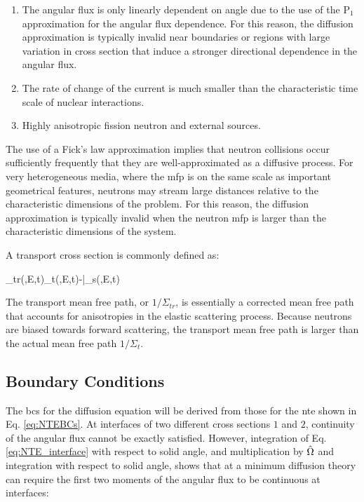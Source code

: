 \begin{enumerate}
\item The angular flux is only linearly dependent on angle due to the use of the P$_{1}$ approximation for the angular flux dependence. For this reason, the diffusion approximation is typically invalid near boundaries or regions with large variation in cross section that induce a stronger directional dependence in the angular flux.
\item The rate of change of the current is much smaller than the characteristic time scale of nuclear interactions.
\item Highly anisotropic fission neutron and external sources.
\end{enumerate}

The use of a Fick's law approximation implies that neutron collisions occur sufficiently frequently that they are well-approximated as a diffusive process. For very heterogeneous media, where the \gls{mfp} is on the same scale as important geometrical features, neutrons may stream large distances relative to the characteristic dimensions of the problem. For this reason, the diffusion approximation is typically invalid when the neutron \gls{mfp} is larger than the characteristic dimensions of the system.

A transport cross section is commonly defined as:

\beq
\label{eq:TransportSigma}
\Sigma_{tr}(,E,t)\equiv\Sigma_t(,E,t)-\bar{\mu}\Sigma_s(,E,t)
\eeq

The transport mean free path, or \(1/\Sigma_{tr}\), is essentially a corrected mean free path that accounts for anisotropies in the elastic scattering process. Because neutrons are biased towards forward scattering, the transport mean free path is larger than the actual mean free path \(1/\Sigma_t\). 

\subsection{Boundary Conditions}

The \glspl{bc} for the diffusion equation will be derived from those for the \gls{nte} shown in Eq. \eqref{eq:NTEBCs}. At interfaces of two different cross sections \(1\) and \(2\), continuity of the angular flux cannot be exactly satisfied. However, integration of Eq. \eqref{eq:NTE_interface} with respect to solid angle, and multiplication by \(\hat{\Omega}\) and integration with respect to solid angle, shows that at a minimum diffusion theory can require the first two moments of the angular flux to be continuous at interfaces:

